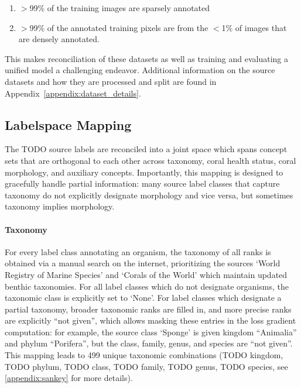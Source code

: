 \documentclass[10pt,twocolumn,letterpaper]{article}
\begin{document}
\begin{enumerate}
\item $>$99\% of the training images are sparsely annotated
\item $>$99\% of the annotated training pixels are from the $<$1\% of images that are densely annotated.
\end{enumerate}
This makes reconciliation of these datasets as well as training and evaluating a unified model a challenging endeavor. Additional information on the source datasets and how they are processed and split are found in Appendix~\ref{appendix:dataset_details}.

\subsection{Labelspace Mapping}

The TODO source labels are reconciled into a joint space which spans concept sets that are orthogonal to each other across taxonomy, coral health status, coral morphology, and auxiliary concepts. %
Importantly, this mapping is designed to gracefully handle partial information: many source label classes that capture taxonomy do not explicitly designate morphology and vice versa, but sometimes taxonomy implies morphology.

\paragraph{Taxonomy} For every label class annotating an organism, the taxonomy of all ranks is obtained via a manual search on the internet, prioritizing the sources `World Registry of Marine Species' \citep{worms} and `Corals of the World' \citep{cotw} which maintain updated benthic taxonomies. For all label classes which do not designate organisms, the taxonomic class is explicitly set to `None'. For label classes which designate a partial taxonomy, broader taxonomic ranks are filled in, and more precise ranks are explicitly ``not given'', which allows masking these entries in the loss gradient computation: for example, the source class `Sponge' is given kingdom ``Animalia'' and phylum ``Porifera'', but the class, family, genus, and species are ``not given''. This mapping leads to 499 %
unique taxonomic combinations (TODO kingdom, TODO phylum, TODO class, TODO family, TODO genus, TODO species, see \ref{appendix:sankey} for more details).
\end{document}
